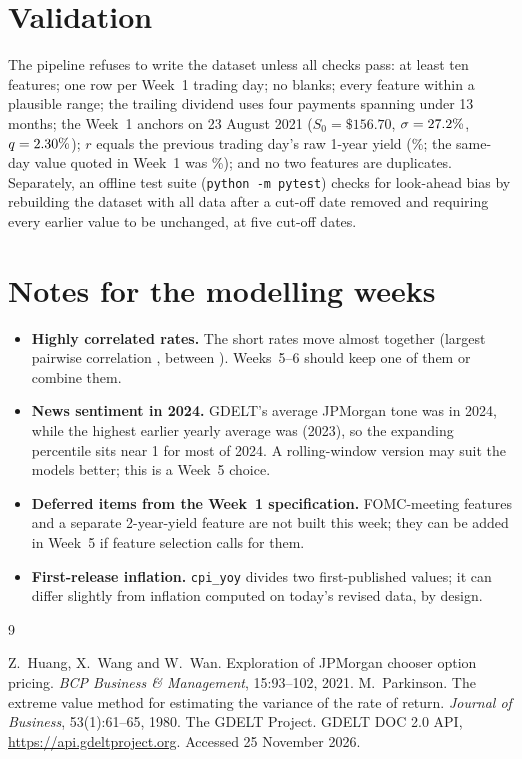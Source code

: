 \documentclass[11pt]{article}
\newcommand{\code}[1]{\texttt{#1}}
\begin{document}
\section{Validation}
The pipeline refuses to write the dataset unless all \wChecks{} checks pass: at least ten features; one row per
Week~1 trading day; no blanks; every feature within a plausible range; the trailing dividend uses four payments
spanning under 13 months; the Week~1 anchors on 23 August 2021 ($S_0=\$156.70$, $\sigma=27.2\%$,
$q=2.30\%$); $r$ equals the previous trading day's raw 1-year yield (\wAnchorr\%; the same-day value quoted in
Week~1 was \wAnchorrsameday\%); and no two features are duplicates. Separately, an offline test suite
(\code{python -m pytest}) checks for look-ahead bias by rebuilding the dataset with all data after a cut-off date
removed and requiring every earlier value to be unchanged, at five cut-off dates.

\section{Notes for the modelling weeks}
\begin{itemize}
  \item \textbf{Highly correlated rates.} The short rates move almost together (largest pairwise correlation
        \wMaxcorr{}, between \wMaxcorrpair). Weeks~5--6 should keep one of them or combine them.
  \item \textbf{News sentiment in 2024.} GDELT's average JPMorgan tone was \wTonetwentyfour{} in 2024, while the highest
        earlier yearly average was \wToneprevmax{} (2023), so the expanding percentile sits near 1 for most of 2024. A rolling-window
        version may suit the models better; this is a Week~5 choice.
  \item \textbf{Deferred items from the Week~1 specification.} FOMC-meeting features and a separate 2-year-yield
        feature are not built this week; they can be added in Week~5 if feature selection calls for them.
  \item \textbf{First-release inflation.} \code{cpi\_yoy} divides two first-published values; it can differ slightly
        from inflation computed on today's revised data, by design.
\end{itemize}

\begin{thebibliography}{9}\small\raggedright
{} Z.~Huang, X.~Wang and W.~Wan. Exploration of JPMorgan chooser option pricing.
  \emph{BCP Business \& Management}, 15:93--102, 2021.
 M.~Parkinson. The extreme value method for estimating the variance of the rate of return.
  \emph{Journal of Business}, 53(1):61--65, 1980.
 The GDELT Project. GDELT DOC 2.0 API, \url{https://api.gdeltproject.org}. Accessed 25 November 2026.
\end{thebibliography}
\end{document}

